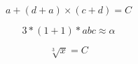 \begin{displaymath}
 a  + (d + a) \times (c + d) = C
\end{displaymath}

\[
3*(1+1)*abc \approx \alpha
\]

\[
\sqrt[3]{x}  = C
\]

